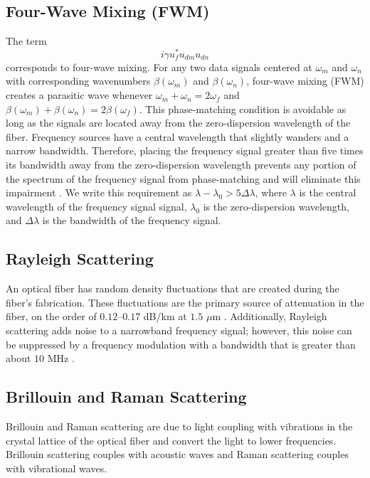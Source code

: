 \subsection{Four-Wave Mixing (FWM)}

The term
%
\begin{equation}
i\gamma u_f^*u_{dm}u_{dn}
\end{equation}
%
corresponds to four-wave mixing. For any two data signals centered at $\omega_m$ and $\omega_n$ with corresponding wavenumbers $\beta(\omega_m)$ and $\beta(\omega_n)$, four-wave mixing (FWM) creates a parasitic wave whenever $\omega_m + \omega_n = 2\omega_f$ and $\beta(\omega_m) + \beta(\omega_n) = 2\beta(\omega_f)$. This phase-matching condition is avoidable as long as the signals are located away from the zero-dispersion wavelength of the fiber. Frequency sources have a central wavelength that slightly wanders and a narrow bandwidth. Therefore, placing the frequency signal greater than five times its bandwidth away from the zero-dispersion wavelength prevents any portion of the spectrum of the frequency signal from phase-matching and will eliminate this impairment \cite{menyukIFCS2015}. We write this requirement as $\lambda-\lambda_0 > 5 \Delta\lambda$, where $\lambda$ is the central wavelength of the frequency signal signal, $\lambda_0$ is the zero-dispersion wavelength, and $\Delta\lambda$ is the bandwidth of the frequency signal.

\subsection{Rayleigh Scattering}

An optical fiber has random density fluctuations that are created during the fiber's fabrication. These fluctuations are the primary source of attenuation in the fiber, on the order of $0.12$--$0.17$ dB/km at $1.5$ $\mu$m \cite{agrawal2012fiber}. Additionally, Rayleigh scattering adds noise to a narrowband frequency signal; however, this noise can be suppressed by a frequency modulation with a bandwidth that is greater than about $10$ MHz \cite{Okusaga:13}.

\subsection{Brillouin and Raman Scattering}

Brillouin and Raman scattering are due to light coupling with vibrations in the crystal lattice of the optical fiber and convert the light to lower frequencies. Brillouin scattering couples with acoustic waves and Raman scattering couples with vibrational waves.

